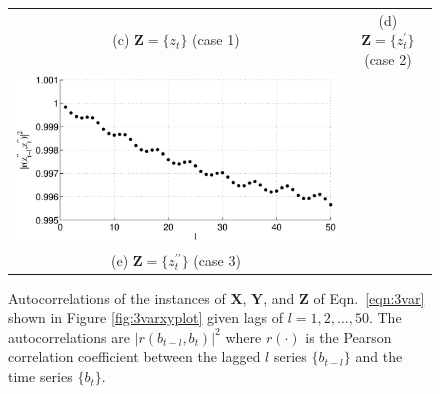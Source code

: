 \begin{figure}[ht]
\begin{tabular}{cc}
(c) $\mathbf{Z} = \{z_t\}$ (case 1)& (d) $\mathbf{Z} = \{z_t^\prime\}$ (case 2)\\
\includegraphics[scale=0.48]{NoisyMultiResponseExample_autocorrZ3.eps} &  \\
(e) $\mathbf{Z} = \{z_t^{\prime\prime}\}$ (case 3)& 
\end{tabular}
\caption{Autocorrelations of the instances of $\mathbf{X}$, $\mathbf{Y}$, and $\mathbf{Z}$ of Eqn.\ \ref{eqn:3var} shown in Figure \ref{fig:3varxyplot} given lags of $l=1,2,\ldots,50$.  The autocorrelations are $|r(b_{t-l},b_t)|^2$ where $r(\cdot)$ is the Pearson correlation coefficient between the lagged $l$ series $\{b_{t-l}\}$ and the time series $\{b_{t}\}$.}
\label{fig:3varxyautocorr}
\end{figure}
